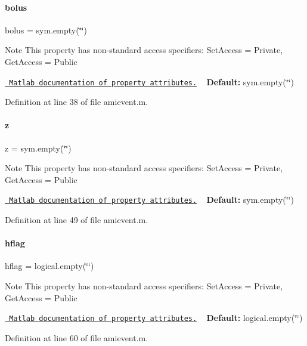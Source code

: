 \paragraph{\texorpdfstring{bolus}{bolus}}
{\footnotesize\ttfamily bolus = sym.\+empty(\char`\"{}\char`\"{})}

\begin{DoxyNote}{Note}
This property has non-\/standard access specifiers\+: {\ttfamily Set\+Access = Private, Get\+Access = Public} 

\href{http://www.mathworks.com/help/matlab/matlab_oop/property-attributes.html}{\texttt{ Matlab documentation of property attributes.}} ~\newline
{\bfseries{Default\+:}} sym.\+empty(\char`\"{}\char`\"{}) 
\end{DoxyNote}


Definition at line 38 of file amievent.\+m.

\mbox{\label{classamievent_a25ed1bcb423b0b7200f485fc5ff71c8e}} 
\paragraph{\texorpdfstring{z}{z}}
{\footnotesize\ttfamily z = sym.\+empty(\char`\"{}\char`\"{})}

\begin{DoxyNote}{Note}
This property has non-\/standard access specifiers\+: {\ttfamily Set\+Access = Private, Get\+Access = Public} 

\href{http://www.mathworks.com/help/matlab/matlab_oop/property-attributes.html}{\texttt{ Matlab documentation of property attributes.}} ~\newline
{\bfseries{Default\+:}} sym.\+empty(\char`\"{}\char`\"{}) 
\end{DoxyNote}


Definition at line 49 of file amievent.\+m.

\mbox{\label{classamievent_ab98347b5ce6fbe7bd007030346b88575}} 
\paragraph{\texorpdfstring{hflag}{hflag}}
{\footnotesize\ttfamily hflag = logical.\+empty(\char`\"{}\char`\"{})}

\begin{DoxyNote}{Note}
This property has non-\/standard access specifiers\+: {\ttfamily Set\+Access = Private, Get\+Access = Public} 

\href{http://www.mathworks.com/help/matlab/matlab_oop/property-attributes.html}{\texttt{ Matlab documentation of property attributes.}} ~\newline
{\bfseries{Default\+:}} logical.\+empty(\char`\"{}\char`\"{}) 
\end{DoxyNote}


Definition at line 60 of file amievent.\+m.

